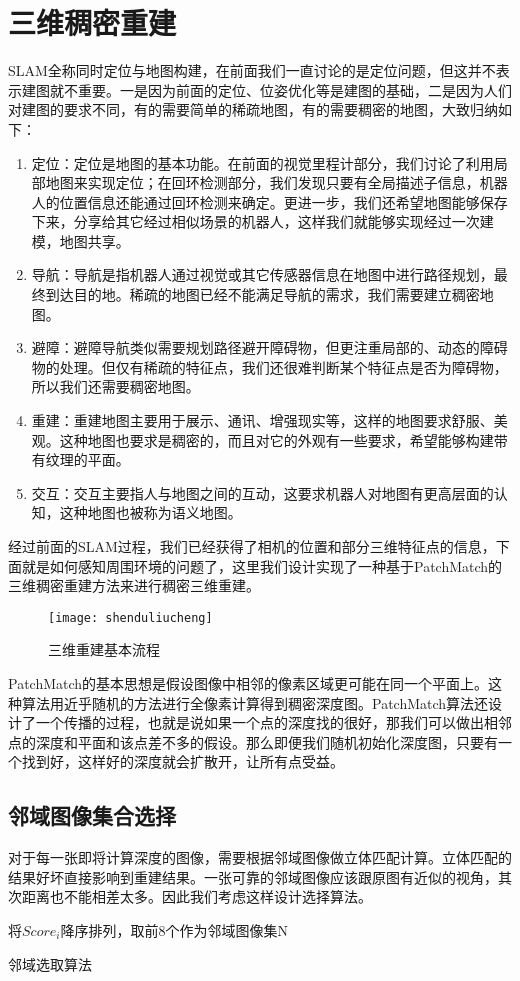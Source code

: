 \chapter{三维稠密重建}
SLAM全称同时定位与地图构建，在前面我们一直讨论的是定位问题，但这并不表示建图就不重要。一是因为前面的定位、位姿优化等是建图的基础，二是因为人们对建图的要求不同，有的需要简单的稀疏地图，有的需要稠密的地图，大致归纳如下：\par
\begin{enumerate}
	\item 定位：定位是地图的基本功能。在前面的视觉里程计部分，我们讨论了利用局部地图来实现定位；在回环检测部分，我们发现只要有全局描述子信息，机器人的位置信息还能通过回环检测来确定。更进一步，我们还希望地图能够保存下来，分享给其它经过相似场景的机器人，这样我们就能够实现经过一次建模，地图共享。
	\item 导航：导航是指机器人通过视觉或其它传感器信息在地图中进行路径规划，最终到达目的地。稀疏的地图已经不能满足导航的需求，我们需要建立稠密地图。
	\item 避障：避障导航类似需要规划路径避开障碍物，但更注重局部的、动态的障碍物的处理。但仅有稀疏的特征点，我们还很难判断某个特征点是否为障碍物， 所以我们还需要稠密地图。
	\item 重建：重建地图主要用于展示、通讯、增强现实等，这样的地图要求舒服、美观。这种地图也要求是稠密的，而且对它的外观有一些要求，希望能够构建带有纹理的平面。
	\item 交互：交互主要指人与地图之间的互动，这要求机器人对地图有更高层面的认知，这种地图也被称为语义地图。
\end{enumerate}\par
经过前面的SLAM过程，我们已经获得了相机的位置和部分三维特征点的信息，下面就是如何感知周围环境的问题了，这里我们设计实现了一种基于PatchMatch的三维稠密重建方法来进行稠密三维重建。\par
\begin{figure}[H]
	\texttt{[image: shenduliucheng]}
	\caption{三维重建基本流程}
\end{figure}
PatchMatch的基本思想是假设图像中相邻的像素区域更可能在同一个平面上。这种算法用近乎随机的方法进行全像素计算得到稠密深度图。PatchMatch算法还设计了一个传播的过程，也就是说如果一个点的深度找的很好，那我们可以做出相邻点的深度和平面和该点差不多的假设。那么即便我们随机初始化深度图，只要有一个找到好，这样好的深度就会扩散开，让所有点受益。
\section{邻域图像集合选择}
对于每一张即将计算深度的图像，需要根据邻域图像做立体匹配计算。立体匹配的结果好坏直接影响到重建结果。一张可靠的邻域图像应该跟原图有近似的视角，其次距离也不能相差太多。因此我们考虑这样设计选择算法。
\begin{algorithm}[H]
	将$Score_i$降序排列，取前8个作为邻域图像集N\;
	\caption{邻域选取算法}
	\label{algo:pickneighber}
\end{algorithm}
